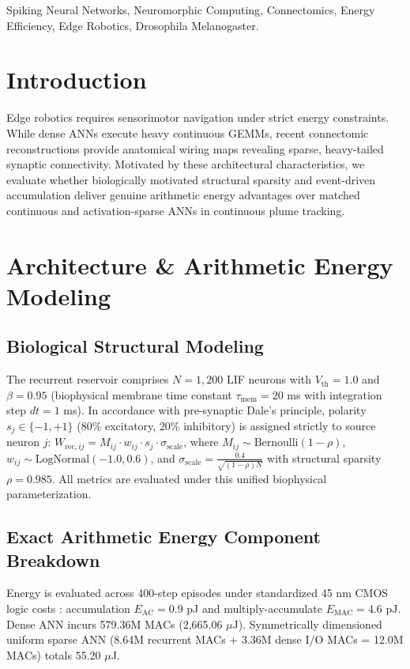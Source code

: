 \documentclass[conference]{IEEEtran}
\begin{document}
\begin{IEEEkeywords}
Spiking Neural Networks, Neuromorphic Computing, Connectomics, Energy Efficiency, Edge Robotics, Drosophila Melanogaster.
\end{IEEEkeywords}

\section{Introduction}
Edge robotics requires sensorimotor navigation under strict energy constraints. While dense ANNs execute heavy continuous GEMMs, recent connectomic reconstructions \cite{dorkenwald2024neuronal, schlegel2024whole} provide anatomical wiring maps revealing sparse, heavy-tailed synaptic connectivity. Motivated by these architectural characteristics, we evaluate whether biologically motivated structural sparsity and event-driven accumulation deliver genuine arithmetic energy advantages over matched continuous and activation-sparse ANNs in continuous plume tracking.

\section{Architecture \& Arithmetic Energy Modeling}

\subsection{Biological Structural Modeling}
The recurrent reservoir comprises $N = 1,200$ LIF neurons with $V_{\text{th}} = 1.0$ and $\beta = 0.95$ (biophysical membrane time constant $\tau_{\text{mem}} = 20$ ms with integration step $dt = 1$ ms). In accordance with pre-synaptic Dale's principle, polarity $s_j \in \{-1, +1\}$ (80\% excitatory, 20\% inhibitory) is assigned strictly to source neuron $j$: $W_{\text{rec},ij} = M_{ij} \cdot w_{ij} \cdot s_j \cdot \sigma_{\text{scale}}$, where $M_{ij} \sim \text{Bernoulli}(1 - \rho)$, $w_{ij} \sim \text{LogNormal}(-1.0, 0.6)$, and $\sigma_{\text{scale}} = \frac{0.4}{\sqrt{(1 - \rho)N}}$ with structural sparsity $\rho = 0.985$. All metrics are evaluated under this unified biophysical parameterization.

\subsection{Exact Arithmetic Energy Component Breakdown}
Energy is evaluated across 400-step episodes under standardized 45 nm CMOS logic costs \cite{horowitz2014computing}: accumulation $E_{\text{AC}} = 0.9$ pJ and multiply-accumulate $E_{\text{MAC}} = 4.6$ pJ. Dense ANN incurs 579.36M MACs (2,665.06 $\mu$J). Symmetrically dimensioned uniform sparse ANN (8.64M recurrent MACs + 3.36M dense I/O MACs = 12.0M MACs) totals 55.20 $\mu$J.
\end{document}
